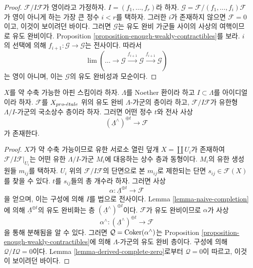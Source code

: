 \begin{proof}
$\mathcal{F}/I\mathcal{F}$가 영이라고 가정하자.
$I = (f_1, \ldots, f_r)$라 하자.
$\mathcal{G} = \mathcal{F}/(f_1, \ldots, f_i)\mathcal{F}$가 영이 아니게
하는 가장 큰 정수 $i < r$를 택하자. 그러한 $i$가 존재하지 않으면
$\mathcal{F} = 0$이고, 이것이 보이려던 바이다. 그러면 $\mathcal{G}$는
유도 완비 가군들 사이의 사상의 여핵이므로 유도 완비이다.
Proposition \ref{proposition-enough-weakly-contractibles}를 보라.
$i$의 선택에 의해 $f_{i + 1} : \mathcal{G} \to \mathcal{G}$는
전사이다. 따라서
$$
\lim (\ldots \to \mathcal{G} \xrightarrow{f_{i + 1}} \mathcal{G}
\xrightarrow{f_{i + 1}} \mathcal{G})
$$
는 영이 아니며, 이는 $\mathcal{G}$의 유도 완비성과 모순이다.
\end{proof}

\begin{lemma}
\label{lemma-derived-complete-limit}
$X$를 약 수축 가능한 아핀 스킴이라 하자. $\Lambda$를 Noether 환이라
하고 $I \subset \Lambda$를 아이디얼이라 하자. $\mathcal{F}$를
$X_{pro\text{-}\acute{e}tale}$ 위의 유도 완비 $\Lambda$-가군의 층이라 하고,
$\mathcal{F}/I\mathcal{F}$가 유한형 $\Lambda/I$-가군의 국소상수 층이라
하자. 그러면 어떤 정수 $t$와 전사 사상
$$
(\underline{\Lambda}^\wedge)^{\oplus t} \to \mathcal{F}
$$
가 존재한다.
\end{lemma}

\begin{proof}
$X$가 약 수축 가능이므로 유한 서로소 열린 덮개
$X = \coprod U_i$가 존재하여 $\mathcal{F}/I\mathcal{F}|_{U_i}$는
어떤 유한 $\Lambda/I$-가군 $M_i$에 대응하는 상수 층과 동형이다.
$M_i$의 유한 생성원들 $m_{ij}$를 택하자. $U_i$ 위의
$\mathcal{F}/I\mathcal{F}$의 단면으로 본 $m_{ij}$로 제한되는 단면
$s_{ij} \in \mathcal{F}(X)$를 찾을 수 있다. $t$를 $s_{ij}$들의 총
개수라 하자. 그러면 사상
$$
\alpha : \underline{\Lambda}^{\oplus t} \longrightarrow \mathcal{F}
$$
을 얻으며, 이는 구성에 의해 $I$를 법으로 전사이다. Lemma
\ref{lemma-naive-completion}에 의해 $\underline{\Lambda}^{\oplus t}$의
유도 완비화는 층 $(\underline{\Lambda}^\wedge)^{\oplus t}$이다.
$\mathcal{F}$가 유도 완비이므로 $\alpha$가 사상
$$
\alpha^\wedge :
(\underline{\Lambda}^\wedge)^{\oplus t}
\longrightarrow
\mathcal{F}
$$
을 통해 분해됨을 알 수 있다. 그러면
$\mathcal{Q} = \mathop{\mathrm{Coker}}(\alpha^\wedge)$는 Proposition
\ref{proposition-enough-weakly-contractibles}에 의해
$\Lambda$-가군의 유도 완비 층이다. 구성에 의해
$\mathcal{Q}/I\mathcal{Q} = 0$이다. Lemma
\ref{lemma-derived-complete-zero}로부터 $\mathcal{Q} = 0$이 따르고,
이것이 보이려던 바이다.
\end{proof}








